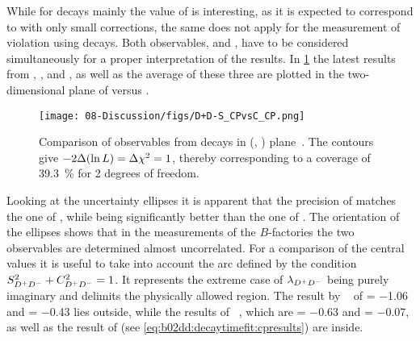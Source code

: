While for \BdToJPsiKS decays mainly the value of \SJpsiKS is interesting, as
it is expected to correspond to \sintwobeta with only small corrections, the
same does not apply for the measurement of \CP violation using \BdToDD decays.
Both observables, \SDD and \CDD, have to be considered simultaneously for a
proper interpretation of the results. In \cref{fig:discussion:b2ddcomparison}
the latest results from \babar, \belle, and \lhcb, as well as the average of
these three are plotted in the two-dimensional plane of \CDD versus \SDD.
\begin{figure}[htb]
\centering
\texttt{[image: 08-Discussion/figs/D+D-S\_CPvsC\_CP.png]}
\caption{Comparison of \CP observables from \mbox{\BdToDD} decays in (\SDD,
\CDD) plane~\cite{HFAG}. The contours give $-2\Delta(\ln L) = \Delta\chi^2 =
1$, thereby corresponding to a coverage of \SI{39.3}{\percent} for 2 degrees
of freedom.}
\label{fig:discussion:b2ddcomparison}
\end{figure}
Looking at the uncertainty ellipses it is apparent that the precision of \lhcb
matches the one of \belle, while being significantly better than the one of
\babar. The orientation of the ellipses shows that in the measurements of the
$B$-factories the two \CP observables are determined almost uncorrelated. For
a comparison of the central values it is useful to take into account the arc
defined by the condition $S_{{{D}^+}{{D}^-}}^2+C_{{{D}^+}{{D}^-}}^2=1$. It represents the extreme case of
$\lambda_{{{D}^+}{{D}^-}}$ being purely imaginary and delimits the physically allowed
region. The result by \belle~\cite{Rohrken:2012ta} of \SDD = \num{-1.06} and
\CDD = \num{-0.43} lies outside, while the results of
\babar~\cite{Aubert:2008ah}, which are \SDD = \num{-0.63} and \CDD =
\num{-0.07}, as well as the result of \lhcb (see
\cref{eq:b02dd:decaytimefit:cpresults}) are inside.
